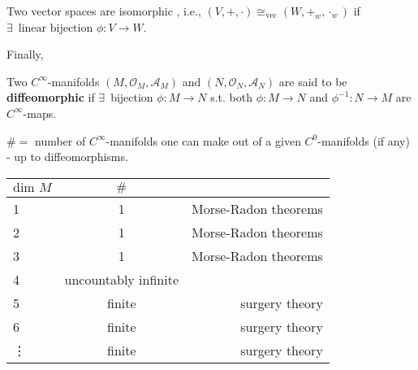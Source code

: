 Two vector spaces are isomorphic , i.e., $(V,+,\cdot) \cong_{\text{vec}} ( W,+_w,\cdot_w)$ if $\exists \, \text{ linear bijection } \phi : V \to W$.

Finally,
\begin{definition}
Two $C^{\infty}$-manifolds $(M,\mathcal{O}_M, \mathcal{A}_M)$ and $(N,\mathcal{O}_N, \mathcal{A}_N)$ are said to be \textbf{diffeomorphic} if $\exists \, $ bijection $\phi : M \to N$ s.t. both $\phi : M \to N$ and $\phi^{-1} : N \to M$ are $C^{\infty}$-maps.


\end{definition}

\begin{theorem}
  $\# = $ number of $C^{\infty}$-manifolds one can make out of a given $C^0$-manifolds (if any) - up to diffeomorphisms.  

\begin{tabular}{l | c | r }
$\text{dim }M$ &  $\#$ &  \\
\hline
1  & 1  & Morse-Radon theorems \\
2  & 1  & Morse-Radon theorems \\
3 & 1  & Morse-Radon theorems \\
4 & uncountably infinite & \\
5 &   finite  & surgery theory \\
6 &  finite & surgery theory \\
\vdots & finite & surgery theory \\
\hline
\end{tabular}

\end{theorem}
